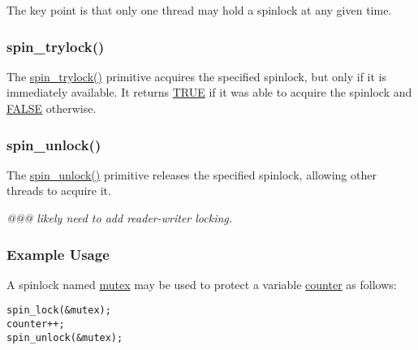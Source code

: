 The key point is that only one thread may hold a spinlock at any
given time.

\subsubsection{spin\_trylock()}

The \url{spin_trylock()} primitive acquires the specified spinlock,
but only if it is immediately available.
It returns \url{TRUE} if it was able to acquire the spinlock and
\url{FALSE} otherwise.

\subsubsection{spin\_unlock()}

The \url{spin_unlock()} primitive releases the specified spinlock,
allowing other threads to acquire it.

\emph{@@@ likely need to add reader-writer locking.}

\subsubsection{Example Usage}

A spinlock named \url{mutex} may be used to protect a variable
\url{counter} as follows:

\vspace{5pt}
\begin{minipage}[t]{\columnwidth}
\small
\begin{verbatim}
spin_lock(&mutex);
counter++;
spin_unlock(&mutex);
\end{verbatim}
\end{minipage}
\vspace{5pt}

\QuickQuizEnd


